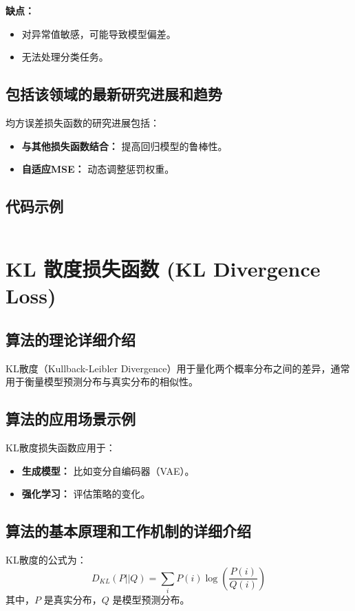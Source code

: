 \textbf{缺点：}
\begin{itemize}
    \item 对异常值敏感，可能导致模型偏差。
    \item 无法处理分类任务。
\end{itemize}

\subsection*{包括该领域的最新研究进展和趋势}
均方误差损失函数的研究进展包括：
\begin{itemize}
    \item \textbf{与其他损失函数结合：} 提高回归模型的鲁棒性。
    \item \textbf{自适应MSE：} 动态调整惩罚权重。
\end{itemize}
\subsection*{代码示例}
\begin{lstlisting}

\end{lstlisting}


\section{KL 散度损失函数 (KL Divergence Loss)}
\subsection*{算法的理论详细介绍}
KL散度（Kullback-Leibler Divergence）用于量化两个概率分布之间的差异，通常用于衡量模型预测分布与真实分布的相似性。

\subsection*{算法的应用场景示例}
KL散度损失函数应用于：
\begin{itemize}
    \item \textbf{生成模型：} 比如变分自编码器（VAE）。
    \item \textbf{强化学习：} 评估策略的变化。
\end{itemize}

\subsection*{算法的基本原理和工作机制的详细介绍}
KL散度的公式为：
\[
    D_{KL}(P || Q) = \sum_{i} P(i) \log\left(\frac{P(i)}{Q(i)}\right)
\]
其中，\(P\) 是真实分布，\(Q\) 是模型预测分布。

